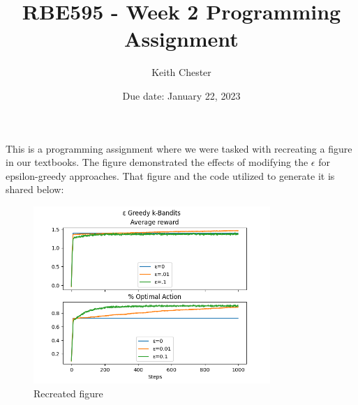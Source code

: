 \documentclass{article}
\title{RBE595 - Week 2 Programming Assignment}
\author{Keith Chester}
\date{Due date: January 22, 2023}
\begin{document}
\maketitle

This is a programming assignment where we were tasked with recreating a figure in our textbooks. The figure demonstrated the effects of modifying the $\epsilon$ for epsilon-greedy approaches. That figure and the code utilized to generate it is shared below:


\begin{figure}[H]
    \centering
    \includegraphics[width = 0.8\textwidth]{./epsilon_greedy.png}
    \caption{Recreated figure}
    \label{fig:chart}
\end{figure}
\end{document}

